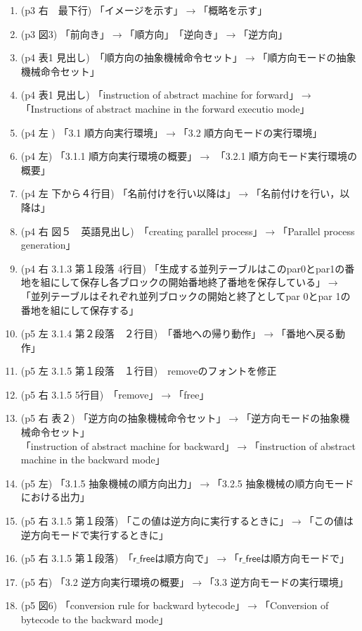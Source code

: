 \documentclass[a4j]{jarticle}
\begin{document}
\begin{enumerate}
\item (p3 右　最下行) 「イメージを示す」$\rightarrow$「概略を示す」
\item (p3 図3) 「前向き」$\rightarrow$「順方向」　「逆向き」$\rightarrow$「逆方向」
\item (p4 表1 見出し)　「順方向の抽象機械命令セット」$\rightarrow$「順方向モードの抽象機械命令セット」 
\item (p4 表1 見出し) 「instruction of abstract machine for forward」$\rightarrow$「Instructions of abstract machine in the forward executio mode」
\item (p4 左 ) 「3.1 順方向実行環境」$\rightarrow$「3.2 順方向モードの実行環境」
\item (p4 左)  「3.1.1 順方向実行環境の概要」$\rightarrow$ 「3.2.1 順方向モード実行環境の概要」
\item (p4 左 下から４行目) 「名前付けを行い以降は」$\rightarrow$「名前付けを行い，以降は」
\item (p4 右 図５　英語見出し)　「creating parallel process」$\rightarrow$「Parallel process generation」
\item (p4 右 3.1.3 第１段落 4行目) 「生成する並列テーブルはこのpar0とpar1の番地を組にして保存し各ブロックの開始番地終了番地を保存している」$\rightarrow$「並列テーブルはそれぞれ並列ブロックの開始と終了としてpar 0とpar 1の番地を組にして保存する」
\item (p5 左 3.1.4 第２段落　２行目)　「番地への帰り動作」$\rightarrow$「番地へ戻る動作」
\item (p5 左 3.1.5 第１段落　１行目)　removeのフォントを修正
\item (p5 右 3.1.5 5行目)　「remove」$\rightarrow$「free」
\item (p5 右 表２) 「逆方向の抽象機械命令セット」$\rightarrow$「逆方向モードの抽象機械命令セット」\\
「instruction of abstract machine for backward」$\rightarrow$「instruction of abstract machine in the backward mode」
\item (p5 左) 「3.1.5 抽象機械の順方向出力」$\rightarrow$「3.2.5 抽象機械の順方向モードにおける出力」
\item (p5 右 3.1.5  第１段落) 「この値は逆方向に実行するときに」$\rightarrow$「この値は逆方向モードで実行するときに」
\item (p5 右 3.1.5 第１段落)　「$\mathsf{r\_free}$は順方向で」$\rightarrow$「$\mathsf{r\_free}$は順方向モードで」
\item (p5 右) 「3.2 逆方向実行環境の概要」$\rightarrow$「3.3 逆方向モードの実行環境」
\item (p5 図6) 「conversion rule for backward bytecode」$\rightarrow$「Conversion of bytecode to the backward mode」

\end{enumerate}
\end{document}

